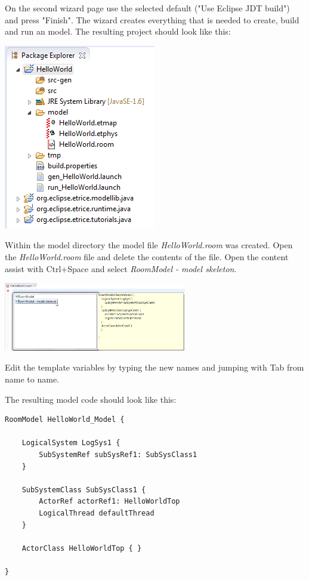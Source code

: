 On the second wizard page use the selected default ("Use Eclipse JDT build") and press "Finish".
The wizard creates everything that is needed to create, build and run an \eTrice{} model. The resulting 
project should look like this:

\includegraphics{images/015-HelloWorld11.png}

Within the model directory the model file \emph{HelloWorld.room} was created. Open the 
\emph{HelloWorld.room} file and delete the contents of the file. Open the content assist with Ctrl+Space 
and select \emph{RoomModel - model skeleton}.

\includegraphics[width=0.6\textwidth]{images/015-HelloWorld12.png}

Edit the template variables by typing the new names and jumping with Tab from name to name.

The resulting model code should look like this:

\begin{lstlisting}[language=ROOM]
RoomModel HelloWorld_Model {

	LogicalSystem LogSys1 {
		SubSystemRef subSysRef1: SubSysClass1
	}

	SubSystemClass SubSysClass1 {
		ActorRef actorRef1: HelloWorldTop
		LogicalThread defaultThread
	}

	ActorClass HelloWorldTop { }

}
\end{lstlisting}

